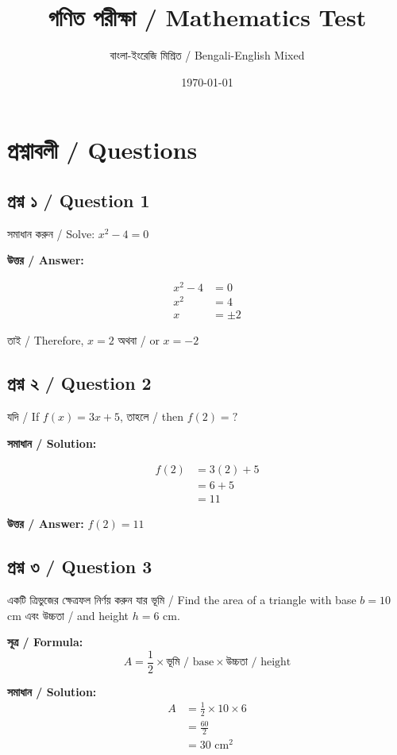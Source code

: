 \documentclass[12pt]{article}
\title{গণিত পরীক্ষা / Mathematics Test}
\author{বাংলা-ইংরেজি মিশ্রিত / Bengali-English Mixed}
\date{\today}
\begin{document}
\maketitle

\section*{প্রশ্নাবলী / Questions}

\subsection*{প্রশ্ন ১ / Question 1}
সমাধান করুন / Solve: $x^2 - 4 = 0$

\textbf{উত্তর / Answer:}

\begin{align*}
    x^2 - 4 &= 0 \\
    x^2 &= 4 \\
    x &= \pm 2
\end{align*}

তাই / Therefore, $x = 2$ অথবা / or $x = -2$

\subsection*{প্রশ্ন ২ / Question 2}
যদি / If $f(x) = 3x + 5$, তাহলে / then $f(2) = ?$

\textbf{সমাধান / Solution:}

\begin{align*}
    f(2) &= 3(2) + 5 \\
    &= 6 + 5 \\
    &= 11
\end{align*}

\textbf{উত্তর / Answer:} $f(2) = 11$

\subsection*{প্রশ্ন ৩ / Question 3}
একটি ত্রিভুজের ক্ষেত্রফল নির্ণয় করুন যার ভূমি / Find the area of a triangle with base $b = 10$ cm এবং উচ্চতা / and height $h = 6$ cm.

\textbf{সূত্র / Formula:}
$$A = \frac{1}{2} \times \text{ভূমি / base} \times \text{উচ্চতা / height}$$

\textbf{সমাধান / Solution:}
\begin{align*}
    A &= \frac{1}{2} \times 10 \times 6 \\
    &= \frac{60}{2} \\
    &= 30 \text{ cm}^2
\end{align*}
\end{document}
